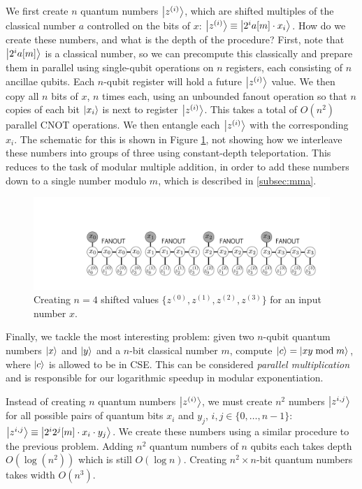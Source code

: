 We first create $n$ quantum numbers $\left\vert{z^{(i)}}\right\rangle$,
which are shifted multiples of the classical number $a$ controlled on the bits
of $x$:
$\left\vert{z^{(i)}}\right\rangle \equiv \left\vert{2^i a[m] \cdot x_i }\right\rangle$.
How do we create these numbers, and what is the depth of the procedure?
First, note that $\left\vert{2^i a[m]}\right\rangle$ is a classical number, so we can
precompute this classically and prepare them in parallel using single-qubit
operations
on $n$ registers, each consisting of $n$ ancillae qubits. Each $n$-qubit
register will hold a future $\left\vert{z^{(i)}}\right\rangle$ value.
We then copy all
$n$ bits of $x$, $n$ times each, using an unbounded fanout operation so that
$n$ copies of each bit $\left\vert{x_i}\right\rangle$ is next to register $\left\vert{z^{(i)}}\right\rangle$.
This takes a total of $O(n^2)$ parallel CNOT operations.
We then entangle each $\left\vert{z^{(i)}}\right\rangle$ with the corresponding $x_i$.
The schematic for this is shown in Figure \ref{fig:mod-mult-create}, not
showing how we interleave these numbers into groups of three using
constant-depth teleportation. This reduces to the task of modular
multiple addition, in order to add these numbers down to a single
number modulo $m$, which is described in \ref{subsec:mma}.

\begin{figure}[htp!]
\centerline{
\includegraphics[width=4.5in]{figures/znumbers.pdf}
}
\caption{Creating $n=4$ shifted values $\{z^{(0)},z^{(1)},z^{(2)},z^{(3)}\}$
for an input number $x$.}
\label{fig:mod-mult-create}
\end{figure}

Finally, we tackle the most interesting problem:
given two $n$-qubit quantum numbers $\left\vert{x}\right\rangle$ and
$\left\vert{y}\right\rangle$ and a $n$-bit classical number
$m$,
compute $\left\vert{c}\right\rangle = \left\vert{xy \bmod m}\right\rangle$,
where $\left\vert{c}\right\rangle$ is allowed to be in CSE.
This can be considered \emph{parallel multiplication} and is responsible
for our logarithmic speedup in modular exponentiation.

Instead of creating $n$ quantum numbers $\left\vert{z^{(i)}}\right\rangle$, we must create
$n^2$ numbers
$\left\vert{z^{i,j}}\right\rangle$ for all possible pairs of quantum bits $x_i$ and $y_j$,
$i,j \in \{0,\ldots,n-1\}$:
$\left\vert{z^{i,j}}\right\rangle \equiv \left\vert{2^i2^j[m]\cdot x_i \cdot y_j}\right\rangle$.
We create these numbers using a similar procedure to the previous problem.
Adding $n^2$ quantum numbers of $n$ qubits each takes depth
$O(\log(n^2))$ which is still $O(\log n)$.
Creating $n^2\times n$-bit quantum numbers takes width $O(n^3)$. 

